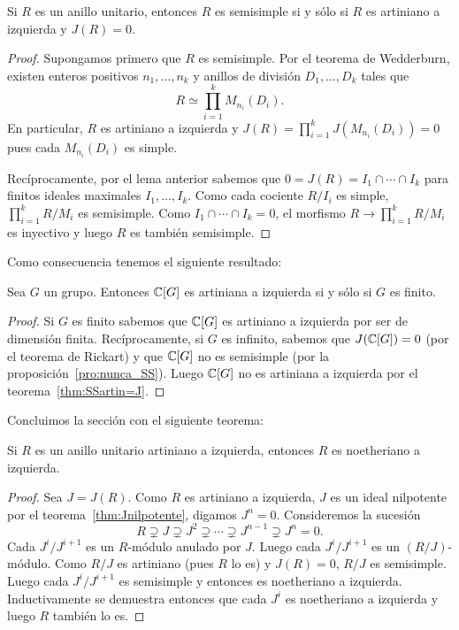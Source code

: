 \begin{theorem}
	\label{thm:SSartin=J}
	Si $R$ es un anillo unitario, entonces $R$ es semisimple si y sólo si $R$
	es artiniano a izquierda y $J(R)=0$.
\end{theorem}

\begin{proof}
	Supongamos primero que $R$ es semisimple. Por el teorema de Wedderburn,
	existen enteros positivos $n_1,\dots,n_k$ y anillos de división
	$D_1,\dots,D_k$ tales que \[
		R\simeq\prod_{i=1}^kM_{n_i}(D_i).
	\]
	En particular, $R$ es
	artiniano a izquierda y $J(R)=\prod_{i=1}^kJ(M_{n_i}(D_i))=0$ pues
	cada $M_{n_i}(D_i)$ es simple. 

	Recíprocamente, por el lema anterior sabemos que $0=J(R)=I_1\cap\cdots\cap I_k$ para
	finitos ideales maximales $I_1,\dots,I_k$.  Como cada cociente $R/I_i$ es
	simple, $\prod_{i=1}^k R/M_i$ es semisimple. Como $I_1\cap\cdots\cap I_k=0$,
	el morfismo $R\to \prod_{i=1}^k R/M_i$ es inyectivo y luego $R$ es también
	semisimple.
\end{proof}

Como consecuencia tenemos el siguiente resultado:

\begin{proposition}
	Sea $G$ un grupo. Entonces $\mathbb{C}[G]$ es artiniana a izquierda si y sólo si
	$G$ es finito. 
\end{proposition}

\begin{proof}
	Si $G$ es finito sabemos que $\mathbb{C}[G]$ es artiniano a izquierda por ser de
	dimensión finita.  Recíprocamente, si $G$ es infinito, sabemos que
	$J(\mathbb{C}[G])=0$ (por el teorema de Rickart) y que $\mathbb{C}[G]$ no es semisimple
	(por la proposición~\ref{pro:nunca_SS}). Luego $\mathbb{C}[G]$ no es artiniana a izquierda por el
	teorema~\ref{thm:SSartin=J}.
\end{proof}

Concluimos la sección con el siguiente teorema:

\begin{theorem}
	\label{thm:Hopkins-Levitski}
	Si $R$ es un anillo unitario artiniano a izquierda, entonces $R$ es
	noetheriano a izquierda.
\end{theorem}

\begin{proof}
	Sea $J=J(R)$. Como $R$ es artiniano a izquierda, $J$ es un ideal nilpotente
	por el teorema~\ref{thm:Jnilpotente}, digamos $J^n=0$. Consideremos la
	sucesión
	\[
		R\supsetneq J\supsetneq J^2\supsetneq\cdots\supsetneq J^{n-1}\supsetneq J^n=0.
	\]
	Cada $J^{i}/J^{i+1}$ es un $R$-módulo anulado por $J$. Luego cada 
	$J^i/J^{i+1}$ es un $(R/J)$-módulo. Como $R/J$ es artiniano (pues $R$ lo
	es) y $J(R)=0$, $R/J$ es semisimple. Luego cada $J^{i}/J^{i+1}$ es
	semisimple y entonces es noetheriano a izquierda.  Inductivamente se
	demuestra entonces que cada $J^i$ es noetheriano a izquierda y luego $R$
	también lo es.
\end{proof}

